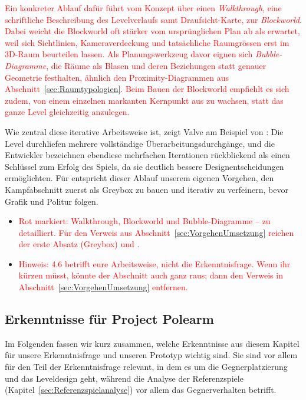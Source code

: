 \documentclass[../Main.tex]{subfiles}
\begin{document}
\textcolor{red}{Ein konkreter Ablauf dafür führt vom Konzept über einen \textit{Walkthrough}, eine schriftliche Beschreibung des Levelverlaufs samt Draufsicht-Karte, zur \textit{Blockworld}. Dabei weicht die Blockworld oft stärker vom ursprünglichen Plan ab als erwartet, weil sich Sichtlinien, Kameraverdeckung und tatsächliche Raumgrössen erst im 3D-Raum beurteilen lassen. Als Planungswerkzeug davor eignen sich \textit{Bubble-Diagramme}, die Räume als Blasen und deren Beziehungen statt genauer Geometrie festhalten, ähnlich den Proximity-Diagrammen aus Abschnitt~\ref{sec:Raumtypologien}. Beim Bauen der Blockworld empfiehlt es sich zudem, von einem einzelnen markanten Kernpunkt aus zu wachsen, statt das ganze Level gleichzeitig anzulegen.\autocite{gdc_leveldesignaday2020}}

Wie zentral diese iterative Arbeitsweise ist, zeigt Valve am Beispiel von \autocite{valve_halflife2_2004}: Die Level durchliefen mehrere vollständige Überarbeitungsdurchgänge, und die Entwickler bezeichnen ebendiese mehrfachen Iterationen rückblickend als einen Schlüssel zum Erfolg des Spiels, da sie deutlich bessere Designentscheidungen ermöglichten.\autocite{jacobson2005postmortem} Für  entspricht dieser Ablauf unserem eigenen Vorgehen, den Kampfabschnitt zuerst als Greybox zu bauen und iterativ zu verfeinern, bevor Grafik und Politur folgen.

\begin{itemize}[leftmargin=1.5cm]
    \item \textcolor{red}{Rot markiert: Walkthrough, Blockworld und Bubble-Diagramme -- zu detailliert. Für den Verweis aus Abschnitt~\ref{sec:VorgehenUmsetzung} reichen der erste Absatz (Greybox) und .}
    \item \textcolor{red}{Hinweis: 4.6 betrifft eure Arbeitsweise, nicht die Erkenntnisfrage. Wenn ihr kürzen müsst, könnte der Abschnitt auch ganz raus; dann den Verweis in Abschnitt~\ref{sec:VorgehenUmsetzung} entfernen.}
\end{itemize}

\subsection{Erkenntnisse für Project Polearm} \label{sec:ZwischenfazitLD}

Im Folgenden fassen wir kurz zusammen, welche Erkenntnisse aus diesem Kapitel für unsere Erkenntnisfrage und unseren Prototyp wichtig sind. Sie sind vor allem für den Teil der Erkenntnisfrage relevant, in dem es um die Gegnerplatzierung und das Leveldesign geht, während die Analyse der Referenzspiele (Kapitel~\ref{sec:Referenzspielanalyse}) vor allem das Gegnerverhalten betrifft.
\end{document}
